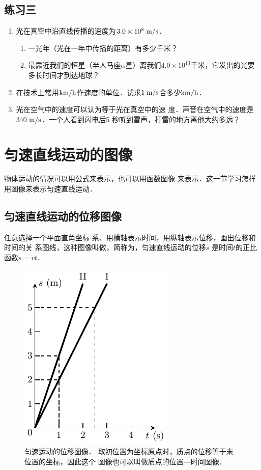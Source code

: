\subsection*{练习三}

\begin{enumerate}
    \item 光在真空中沿直线传播的速度为$3.0\times 10^8\;\text{m}/\text{s}$．
\begin{enumerate}
    \item 一光年（光在一年中传播的距离）有多少千米？
    \item 最靠近我们的恒星（半人马座$\alpha$星）离我们$4.0\times 10^{13}$千米，它发出的光要多长时间才到达地球？
\end{enumerate}    
\item  在技术上常用$\text{km}/\text{h}$作速度的单位．试求$1 \;\text{m}/\text{s}$合多少$\text{km}/\text{h}$．
\item 光在空气中的速度可以认为等于光在真空中的速
度．声音在空气中的速度是340$\;\text{m}/\text{s}$．一个人看到闪电后5
秒听到雷声，打雷的地方离他大约多远？

\end{enumerate}

\section{匀速直线运动的图像}
    物体运动的情况可以用公式来表示，也可以用函数图像
来表示．这一节学习怎样用图像来表示匀速直线运动．

    \subsection{匀速直线运动的位移图像} 
    
    任意选择一个平面直角坐标
系、用横轴表示时间，用纵轴表示位移，画出位移和时间的关
系图线，这种图像叫做，简称为，匀速直线运动的位移$s$
是时间$t$的正比函数$s=vt$．
\begin{figure}[htp]
    \centering
    \includegraphics{fig/A/2-8.pdf}
    \caption{匀速运动的位移图像．
    取初位置为坐标原点时，质点的位移等于末位置的坐标，因此这个
    图像也可以叫做质点的位置—时间图像．}\label{fig_A_2-8}
\end{figure}

